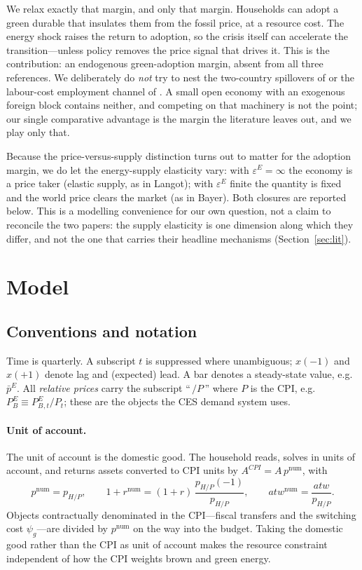 \documentclass[11pt,a4paper]{article}
\newcommand{\num}{\mathrm{num}}
\newcommand{\PEB}{P^{E}_{B}}
\newcommand{\pE}{p^{E}}
\begin{document}
We relax exactly that margin, and only that margin. Households can adopt a
green durable that insulates them from the fossil price, at a resource cost.
The energy shock raises the return to adoption, so the crisis itself can
accelerate the transition---unless policy removes the price signal that drives
it. This is the contribution: an endogenous green-adoption margin, absent from
all three references. We deliberately do \emph{not} try to nest the two-country
spillovers of \citet{Bayer2026} or the labour-cost employment channel of
\citet{Langot2026}. A small open economy with an exogenous foreign block
contains neither, and competing on that machinery is not the point; our single
comparative advantage is the margin the literature leaves out, and we play only
that.

Because the price-versus-supply distinction turns out to matter for the
adoption margin, we do let the energy-supply elasticity vary: with
$\varepsilon^{E}=\infty$ the economy is a price taker (elastic supply, as in
Langot); with $\varepsilon^{E}$ finite the quantity is fixed and the world
price clears the market (as in Bayer). Both closures are reported below. This
is a modelling convenience for our own question, not a claim to reconcile the
two papers: the supply elasticity is one dimension along which they differ, and
not the one that carries their headline mechanisms (Section~\ref{sec:lit}).


\section{Model}\label{sec:model}

\subsection{Conventions and notation}

Time is quarterly. A subscript $t$ is suppressed where unambiguous; $x(-1)$ and
$x(+1)$ denote lag and (expected) lead. A bar denotes a steady-state value,
e.g.\ $\bar\pE$. All \emph{relative prices} carry the subscript ``\,$/P$\,''
where $P$ is the CPI, e.g.\ $\PEB\equiv \PEB{}_{,t}/P_t$; these are the objects
the CES demand system uses.

\paragraph{Unit of account.} The unit of account is the domestic good. The
household reads, solves in units of account, and returns assets converted to CPI
units by $A^{CPI}=A\,p^{\num}$, with
\begin{equation}
p^{\num}=p_{H/P},\qquad
1+r^{\num}=(1+r)\,\frac{p_{H/P}(-1)}{p_{H/P}},\qquad
atw^{\num}=\frac{atw}{p_{H/P}} .
\end{equation}
Objects contractually denominated in the CPI---fiscal transfers and the
switching cost $\psi_g$---are divided by $p^{\num}$ on the way into the budget.
Taking the domestic good rather than the CPI as unit of account makes the
resource constraint independent of how the CPI weights brown and green energy.
\end{document}
